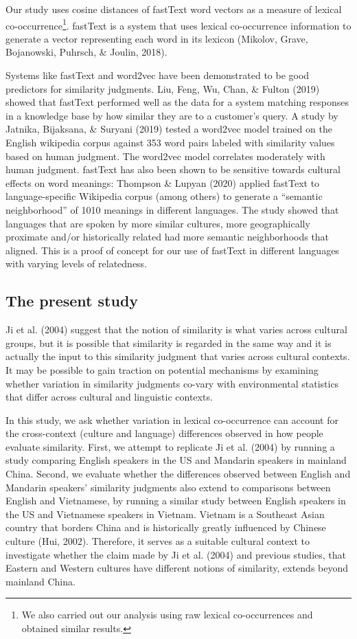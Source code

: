 \documentclass[10pt, letterpaper]{article}
\begin{document}
Our study uses cosine distances of fastText word vectors as a measure of
lexical co-occurrence\footnote{We also carried out our analysis using
  raw lexical co-occurrences and obtained similar results.}. fastText is
a system that uses lexical co-occurrence information to generate a
vector representing each word in its lexicon (Mikolov, Grave,
Bojanowski, Puhrsch, \& Joulin, 2018).

Systems like fastText and word2vec have been demonstrated to be good
predictors for similarity judgments. Liu, Feng, Wu, Chan, \& Fulton
(2019) showed that fastText performed well as the data for a system
matching responses in a knowledge base by how similar they are to a
customer's query. A study by Jatnika, Bijaksana, \& Suryani (2019)
tested a word2vec model trained on the English wikipedia corpus against
353 word pairs labeled with similarity values based on human judgment.
The word2vec model correlates moderately with human judgment. fastText
has also been shown to be sensitive towards cultural effects on word
meanings: Thompson \& Lupyan (2020) applied fastText to
language-specific Wikipedia corpus (among others) to generate a
``semantic neighborhood'' of 1010 meanings in different languages. The
study showed that languages that are spoken by more similar cultures,
more geographically proximate and/or historically related had more
semantic neighborhoods that aligned. This is a proof of concept for our
use of fastText in different languages with varying levels of
relatedness.

\hypertarget{the-present-study}{%
\subsection{The present study}\label{the-present-study}}

Ji et al. (2004) suggest that the notion of similarity is what varies
across cultural groups, but it is possible that similarity is regarded
in the same way and it is actually the input to this similarity judgment
that varies across cultural contexts. It may be possible to gain
traction on potential mechanisms by examining whether variation in
similarity judgments co-vary with environmental statistics that differ
across cultural and linguistic contexts.

In this study, we ask whether variation in lexical co-occurrence can
account for the cross-context (culture and language) differences
observed in how people evaluate similarity. First, we attempt to
replicate Ji et al. (2004) by running a study comparing English speakers
in the US and Mandarin speakers in mainland China. Second, we evaluate
whether the differences observed between English and Mandarin speakers'
similarity judgments also extend to comparisons between English and
Vietnamese, by running a similar study between English speakers in the
US and Vietnamese speakers in Vietnam. Vietnam is a Southeast Asian
country that borders China and is historically greatly influenced by
Chinese culture (Hui, 2002). Therefore, it serves as a suitable cultural
context to investigate whether the claim made by Ji et al. (2004) and
previous studies, that Eastern and Western cultures have different
notions of similarity, extends beyond mainland China.
\end{document}
